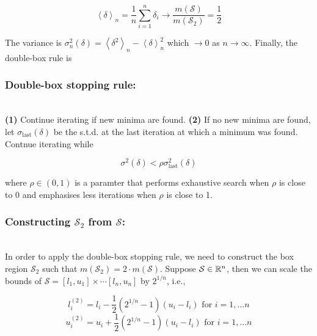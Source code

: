 $$
\left\langle \delta \right\rangle_n = \frac{1}{n}\sum_{i=1}^n \delta_i \longrightarrow
\frac{m(\mathcal{S})}{m(\mathcal{S}_2)} = \frac{1}{2}
$$

The variance is $\sigma_n^2(\delta) = \left\langle \delta^2\right\rangle_n - \left\langle\delta\right\rangle^2_n$ which
$\longrightarrow 0$ as $n\longrightarrow \infty$. Finally, the double-box rule is

\subsubsection*{Double-box stopping rule:}

\hfill\\

\textbf{(1)} Continue iterating if new minima are found. \textbf{(2)} If no new minima are found, let $\sigma_\text{last}(\delta)$ be the s.t.d. at the last iteration
at which a minimum was found. Contnue iterating while

\begin{equation}\label{eq:double-box-rule}
    \sigma^2(\delta) < \rho \sigma^2_{\text{last}}(\delta)
\end{equation}

where $\rho \in (0,1)$ is a paramter that performs exhaustive search when $\rho$ is close to 0 and emphasises less iterations
when $\rho$ is close to 1.

\subsubsection*{Constructing $\mathcal{S}_2$ from $\mathcal{S}$:}

\hfill\\

In order to apply the double-box stopping rule, we need to construct the box region $\mathcal{S}_2$ such that
$m(\mathcal{S}_2) = 2\cdot m(\mathcal{S})$. Suppose $\mathcal{S}\in\mathbb{R}^n$, then we can scale the bounds of $\mathcal{S}
= [l_1, u_1] \times \cdots [l_n, u_n]$ 
by $2^{1/n}$, i.e.,

$$
l_i^{(2)} = l_i - \frac{1}{2}\left( 2^{1/n} - 1\right)\left( u_i - l_i \right)\text{ for } i = 1,\ldots n
$$
$$
u_i^{(2)} = u_i + \frac{1}{2}\left( 2^{1/n} - 1\right)\left( u_i - l_i \right)\text{ for } i = 1,\ldots n
$$


